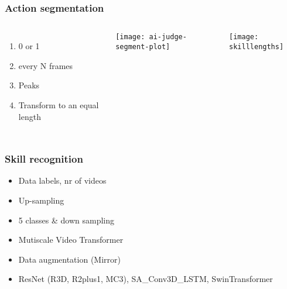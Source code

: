 \documentclass[aspectratio=169]{beamer}
\begin{document}
\begin{frame}
  \frametitle{Action segmentation}

  \begin{columns}[c]
    
    \vspace{-1.0cm}
    \begin{enumerate}
      \item 0 or 1
      \item every N frames
      \item Peaks
      \item Transform to an equal length
    \end{enumerate}
    \vspace{1.0cm}
    \texttt{[image: ai-judge-segment-plot]}
    
    \texttt{[image: skilllengths]}

  \end{columns}
\end{frame}

\begin{frame}
  \frametitle{Skill recognition}

  \begin{itemize}
    \item Data labels, nr of videos
    \item Up-sampling
    \item 5 classes \& down sampling
    \item Mutiscale Video Transformer
    \item Data augmentation (Mirror)
    \item ResNet (R3D, R2plus1, MC3), SA\_Conv3D\_LSTM, SwinTransformer
  \end{itemize}
\end{frame}
\end{document}
